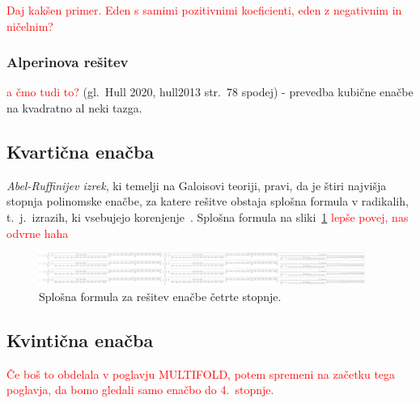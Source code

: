 \textcolor{red}{Daj kakšen primer. Eden s samimi pozitivnimi koeficienti, eden z negativnim in ničelnim?}

\subsubsection{Alperinova rešitev}

\textcolor{red}{a čmo tudi to?} (gl.\ Hull 2020, hull2013 str.\ 78 spodej) - prevedba kubične enačbe na kvadratno al neki tazga.

\subsection{Kvartična enačba}

\emph{Abel-Ruffinijev izrek}, ki temelji na Galoisovi teoriji, pravi, da je štiri najvišja stopnja polinomske enačbe, za katere rešitve obstaja splošna formula v radikalih, t.\ j.\ izrazih, ki vsebujejo korenjenje~\cite{mrinal2019}. Splošna formula na sliki~\ref{fig:kvarticna_formula} \textcolor{red}{lepše povej, nas odvrne haha}

\begin{figure}[h]
    \centering
    \includegraphics[width=0.95\textwidth]{images/quartic_formula.png}
    \caption[Kvartična formula]{Splošna formula za rešitev enačbe četrte stopnje.}
    \label{fig:kvarticna_formula}
\end{figure}


\subsection{Kvintična enačba}

\textcolor{red}{Če boš to obdelala v poglavju MULTIFOLD, potem spremeni na začetku tega poglavja, da bomo gledali samo enačbo do 4.\ stopnje.}
